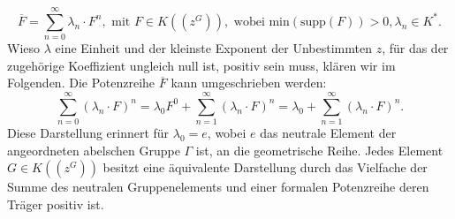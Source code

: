 \[\overline{F} = \sum_{n=0}^{\infty}\lambda_n\cdot F^n, \text{ mit } F \in K\left(\left(z^{G}\right)\right), \text{ wobei } \text{min}\left(\text{supp}\left(F\right)\right) > 0, \lambda_n \in K^*. \]
Wieso $\lambda$ eine Einheit und der kleinste Exponent der Unbestimmten $z$, für das der zugehörige Koeffizient ungleich null ist, positiv sein muss, klären wir im Folgenden. Die Potenzreihe $\overline{F}$ kann umgeschrieben werden:
\[\sum_{n=0}^{\infty}\left(\lambda_n\cdot F\right)^n = \lambda_0 F^0 + \sum_{n=1}^{\infty}\left(\lambda_n\cdot F\right)^n = \lambda_0 + \sum_{n=1}^{\infty}\left(\lambda_n\cdot F\right)^n.\] 
Diese Darstellung erinnert für $\lambda_0 = e$, wobei $e$ das neutrale Element der angeordneten abelschen Gruppe $\Gamma$ ist, an die geometrische Reihe. Jedes Element $G \in K\left(\left(z^{G}\right)\right)$ besitzt eine äquivalente Darstellung durch das Vielfache der Summe des neutralen Gruppenelements und einer formalen Potenzreihe deren Träger positiv ist. 


